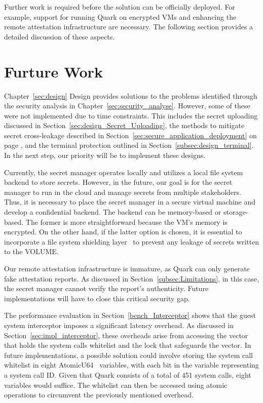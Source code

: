 Further work is required before the solution can be officially deployed. For example, support for running Quark on encrypted VMs and enhancing the remote attestation infrastructure are necessary. The following section provides a detailed discussion of these aspects.


\section{Furture Work}

Chapter~\ref{sec:design} Design provides solutions to the problems identified through the security analysis in Chapter~\ref{sec:security_analyse}. However, some of these were not implemented due to time constraints. This includes the secret uploading discussed in Section~\ref{sec:design_Secret_Uploading}, the methods to 
mitigate secret cross-leakage described in Section~\ref{sec:secure_application_deployment} on page \pageref{eq:1}, and the terminal protection outlined in Section~\ref{subsec:design_terminal}. In the next step, our priority will be to implement these designs.

Currently, the secret manager operates locally and utilizes a local file system backend to store secrets. However, in the future, our goal is for the secret manager to run in the cloud and manage secrets from multiple stakeholders. Thus, it is necessary to place the secret manager in a secure virtual 
machine and develop a confidential backend. The backend can be memory-based or storage-based. The former is more straightforward because the VM's memory is encrypted. On the other hand, if the latter option is chosen, it is essential to incorporate a file system shielding layer~\cite*{file_system_shield} to prevent any leakage 
of secrets written to the VOLUME.

Our remote attestation infrastructure is immature, as Quark can only generate fake attestation reports. As discussed in Section~\ref{subsec:Limitations}, in this case, the secret manager cannot verify the report's authenticity. Future implementations will have to close this critical security 
gap.

The performance evaluation in Section~\ref{bench_Interceptor} shows that the guest system interceptor imposes a significant latency overhead. As discussed in Section~\ref{sec:impl_interceptor}, these overheads arise from accessing the vector that holds the system calls whitelist and the lock that safeguards the vector. In future implementations, 
a possible solution could involve storing the system call whitelist in eight AtomicU64~\cite*{rust_automic_u64} variables, with each bit in the variable representing a system call ID. Given that Quark consists of a total of 451 system calls, eight variables would suffice. The whitelist can then be accessed using atomic 
operations to circumvent the previously mentioned overhead.

